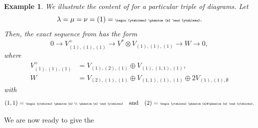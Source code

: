 \documentclass[11pt]{article}
\theoremstyle{plain}
\theoremstyle{nonumberplain}
\theoremstyle{plain}
\newtheorem{example}[lemma]{Example}
\theoremstyle{nonumberplain}
\begin{document}
\begin{example}\label{ex.trnsl}
  We illustrate the content of  for a particular triple of diagrams. Let
  \begin{equation*}
    \lambda=\mu=\nu=(1)={\tiny
      \begin{ytableau}
        \phantom{a}
      \end{ytableau}
}.
  \end{equation*}
  Then, the exact sequence from  has the form
  \begin{equation*}
    0\to V^+_{(1),(1),(1)}\to V^*\otimes V_{(1),(1),(1)} \to W \to 0,
  \end{equation*}
  where
  \begin{align*}
    V^+_{(1),(1),(1)} &= V_{(1),(2),(1)}\oplus V_{(1),(1,1),(1)},\\
    W&=V_{(2),(1),(1)}\oplus V_{(1,1),(1),(1)}\oplus 2V_{(1),(1),\emptyset}                  
  \end{align*}
  with
  \begin{equation*}
    (1,1) = {\tiny
      \begin{ytableau}
        \phantom{a} \\
        \phantom{a}
      \end{ytableau}
    }\quad
    \text{and}
    \quad
    (2)={\tiny
      \begin{ytableau}
        \phantom{a}&\phantom{a}
      \end{ytableau}
}.
  \end{equation*}
\end{example}


We are now ready to give the
\end{document}
